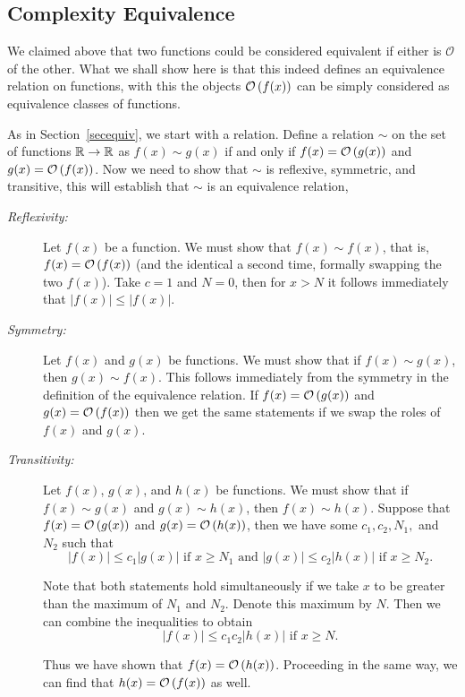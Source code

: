 \subsection{Complexity Equivalence}
\label{equivcomp}

We claimed above that two functions could be considered equivalent if
either is $\mathcal{O}$ of the other. What we shall show here is that this
indeed defines an equivalence relation on functions, with this the objects
${\mathcal O}\/\left(f(x)\right)$ can be simply considered as equivalence classes of functions.

As in Section~\ref{secequiv}, we start with a relation.
Define a relation $\sim$ on the set of functions ${\mathbb R}\to{\mathbb R}$ as $f(x)\sim g(x)$
if and only if $f(x) = {\mathcal O}\/\left(g(x)\right)$ and $g(x) = {\mathcal O}\/\left(f(x)\right)$. Now 
we need to show that $\sim$ is reflexive, symmetric, and transitive, this
will establish that $\sim$ is an equivalence relation,

\begin{description}
\item[\textit{Reflexivity:}] Let $f(x)$ be a function. We must show that $f(x)\sim
f(x)$, that is, $f(x) = {\mathcal O}\/\left(f(x)\right)$ (and the identical a second time,
formally swapping the two $f(x)$).
Take $c=1$ and $N=0$, then for $x>N$ it follows immediately that $|f(x)| \leq |f(x)|$.

\item[\textit{Symmetry:}] Let $f(x)$ and $g(x)$ be functions. We must show that if $f(x) \sim g(x)$, then $g(x) \sim f(x)$.
This follows immediately from the symmetry in the definition of the equivalence relation. 
If $f(x) = {\mathcal O}\/\left(g(x)\right)$ and $g(x) = {\mathcal O}\/\left(f(x)\right)$
then we get the same statements if we swap the roles of $f(x)$ and $g(x)$.

\item[\textit{Transitivity:}] Let $f(x)$, $g(x)$, and $h(x)$ be functions. We must show that
if $f(x) \sim g(x)$ and $g(x)\sim h(x)$, then $f(x)\sim h(x)$. Suppose that
$f(x) = {\mathcal O}\/\left(g(x)\right)$
and $g(x) = {\mathcal O}\/\left(h(x)\right)$, then we have some $c_1,c_2,N_1,$ and $N_2$ such that
\[
	|f(x)|\leq c_1|g(x)| \text{ if } x\geq N_1 \text{ and } |g(x)|\leq c_2|h(x)| \text{ if } x \geq N_2.
\]

Note that both statements hold simultaneously if we take $x$ to be greater than the maximum of $N_1$ and $N_2$. Denote
this maximum by $N$. Then we can combine the inequalities to obtain
\[
	|f(x)|\leq c_1 c_2|h(x)| \text{ if } x \geq N.
\]

Thus we have shown that $f(x) = {\mathcal O}\/\left(h(x)\right)$. Proceeding in the same way, we can
find that $h(x) = {\mathcal O}\/\left(f(x)\right)$ as well.
\end{description}

